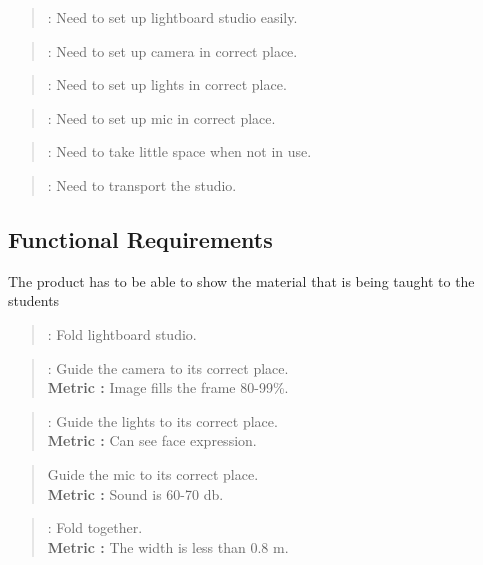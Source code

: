 \documentclass[a4paper]{jpconf}
\begin{document}
\begin{quote}
	\textbf{} : Need to set up lightboard studio easily.
\end{quote}

\begin{quote}
	\textbf{} : Need to set up camera in correct place.
\end{quote}

\begin{quote} 
	\textbf{} : Need to set up lights in correct place.
\end{quote}

\begin{quote} 
	\textbf{} :  Need to set up mic in correct place.
\end{quote}

\begin{quote} 
	\textbf{} :  Need to take little space when not in use.
\end{quote}

\begin{quote} 
	\textbf{} :  Need to transport the studio.
\end{quote}

\subsection{Functional Requirements} \label{FR}
The product has to be able to show the material that is being taught to the students
\begin{quote} 
	\textbf{} : Fold lightboard studio.
\end{quote}

\begin{quote} 
	\textbf{} :  Guide  the camera to its correct place.
	\\ \textbf{Metric :} Image fills the frame 80-99\%.
\end{quote}

\begin{quote} 
	\textbf{} :  Guide the lights  to its correct place.
	\\ \textbf{Metric :} Can see face expression.
\end{quote}

\begin{quote} 
	\textbf{} Guide the mic  to its correct place.
	\\ \textbf{Metric :} Sound is 60-70 db\cite{db}.
\end{quote}

\begin{quote} 
	\textbf{} :  Fold together.
	\\ \textbf{Metric :} The width is less than 0.8 m.
\end{quote}
\end{document}
